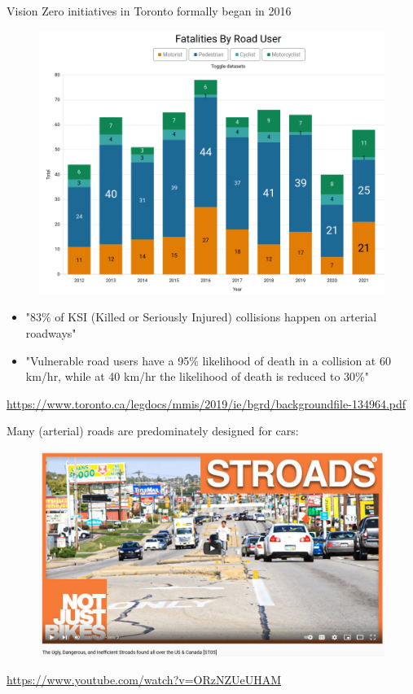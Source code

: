 \documentclass[aspectratio=169]{beamer}
\begin{document}
\begin{frame}
	
	Vision Zero initiatives in Toronto formally began in 2016
		
	\begin{figure}
		\centering
		\includegraphics[width=0.55\linewidth]{images/vision_zero_deaths.png}
		
	\end{figure}

	\small
	\begin{itemize}
		\item "83\% of KSI (Killed or Seriously Injured) collisions happen on arterial roadways"
		\item "Vulnerable road users have a 95\% likelihood of death
		in a collision at 60 km/hr, while at 40 km/hr the likelihood of death is reduced to 30\%"
	\end{itemize}

	\tiny{\url{https://www.toronto.ca/legdocs/mmis/2019/ie/bgrd/backgroundfile-134964.pdf}}
	
\end{frame}



\begin{frame}
	
	Many (arterial) roads are predominately designed for cars:
	
	\begin{figure}
		\centering
		\includegraphics[width=0.85\linewidth]{images/stroads.png}
		
	\end{figure}
	\tiny{\url{https://www.youtube.com/watch?v=ORzNZUeUHAM}}
	
\end{frame}
\end{document}
